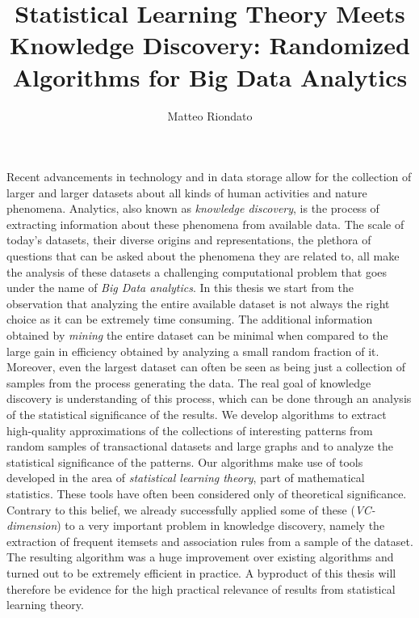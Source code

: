 \documentclass[12pt]{article}
\title{Statistical Learning Theory Meets Knowledge Discovery: Randomized Algorithms for Big Data Analytics}
\author{Matteo Riondato}
\date{}
\begin{document}
\maketitle
\thispagestyle{empty}
Recent advancements in technology and in data storage allow for the collection
of larger and larger datasets about all kinds of human activities and nature
phenomena.
Analytics, also known as \emph{knowledge discovery}, is the process of extracting
information about these phenomena from available data. The scale of today's
datasets, their diverse origins and representations, the plethora of questions
that can be asked about the phenomena they are related to, all make the analysis
of these datasets a challenging computational problem that goes under the name
of \emph{Big Data analytics}. In this thesis we start from the observation that
analyzing the entire available dataset is not always the right choice as it can
be extremely time consuming. The additional information obtained by
\emph{mining} the entire dataset can be minimal when compared to the large gain in
efficiency obtained by analyzing a small random fraction of it.
Moreover, even the largest dataset can often be seen as being just a collection of
samples from the process generating the data. The real goal of knowledge
discovery is understanding of this process, which can be done through an
analysis of the statistical significance of the results. We develop algorithms
to extract high-quality approximations of the collections of interesting patterns
from random samples of transactional datasets and large graphs and to analyze
the statistical significance of the patterns. Our algorithms make use of tools
developed in the area of \emph{statistical learning theory}, part of mathematical
statistics. These tools have often been considered only of theoretical
significance. Contrary to this belief, we already successfully applied some of
these (\emph{VC-dimension}) to a very important problem in knowledge discovery, namely
the extraction of frequent itemsets and association rules from a sample of the
dataset. The resulting algorithm was a huge improvement over existing algorithms
and turned out to be extremely efficient in practice. A byproduct of this
thesis will therefore be evidence for the high practical relevance of results
from statistical learning theory.
\end{document}
